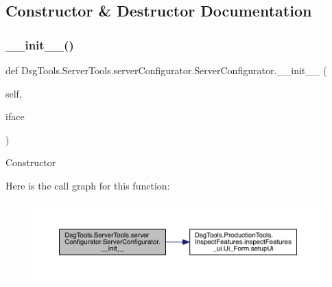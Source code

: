 \subsection{Constructor \& Destructor Documentation}
\mbox{\label{class_dsg_tools_1_1_server_tools_1_1server_configurator_1_1_server_configurator_a0d4e6c6b05ef88a6b280e4e5fc6df1b2}} 
\subsubsection{\texorpdfstring{\+\_\+\+\_\+init\+\_\+\+\_\+()}{\_\_init\_\_()}}
{\footnotesize\ttfamily def Dsg\+Tools.\+Server\+Tools.\+server\+Configurator.\+Server\+Configurator.\+\_\+\+\_\+init\+\_\+\+\_\+ (\begin{DoxyParamCaption}\item[{}]{self,  }\item[{}]{iface }\end{DoxyParamCaption})}

\begin{DoxyVerb}Constructor
\end{DoxyVerb}
 Here is the call graph for this function\+:
\nopagebreak
\begin{figure}[H]
\begin{center}
\leavevmode
\includegraphics[width=350pt]{class_dsg_tools_1_1_server_tools_1_1server_configurator_1_1_server_configurator_a0d4e6c6b05ef88a6b280e4e5fc6df1b2_cgraph}
\end{center}
\end{figure}


